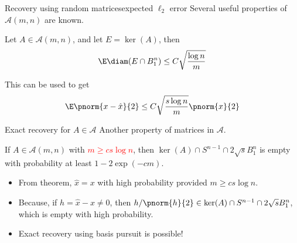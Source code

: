 \documentclass{beamer}
\begin{document}
\begin{frame}{Recovery using random matrices}{expected $\ell_2$ error}
	Several useful properties of $\mathcal{A}(m, n)$ are known.
	
	\pause

	\begin{theorem}
		Let $A\in\mathcal{A}(m, n)$, and 
		let $E = \ker(A)$, then 
		\[
			\E\diam(E\cap B_1^n)\leq C\sqrt{\frac{\log n}{m}}
		\]
	\end{theorem}

	\pause


	This can be used to get
		\[
			\E\pnorm{x - \hat{x}}{2}\leq C\sqrt{\frac{{s\log n}}
			{{m}}}\pnorm{x}{2}
		\]

\end{frame}

\begin{frame}{Exact recovery for $A\in\mathcal{A}$}
	Another property of matrices in $\mathcal{A}$.
	\begin{theorem}
		If $A\in\mathcal{A}(m, n)$ with \textcolor{red}{$m\geq cs\log n$}, then
		$\ker(A) \cap S^{n-1} \cap 2\sqrt{s}B_1^n$ is empty
		with probability at least $1-2\exp(-cm)$.
	\end{theorem}

	\pause

	\begin{itemize}
		\item From theorem, $\hat{x} = x$ with high
			probability provided $m \geq cs\log n$.

		\item Because, if $h = \hat{x}-x\neq 0$, then
			$h/\pnorm{h}{2}\in \ker(A)\cap S^{n-1}\cap 2\sqrt{s}B_1^n$, which
			is empty with high probability.

			\pause

		\item Exact recovery using basis pursuit is possible!
	\end{itemize}
\end{frame}
\end{document}
